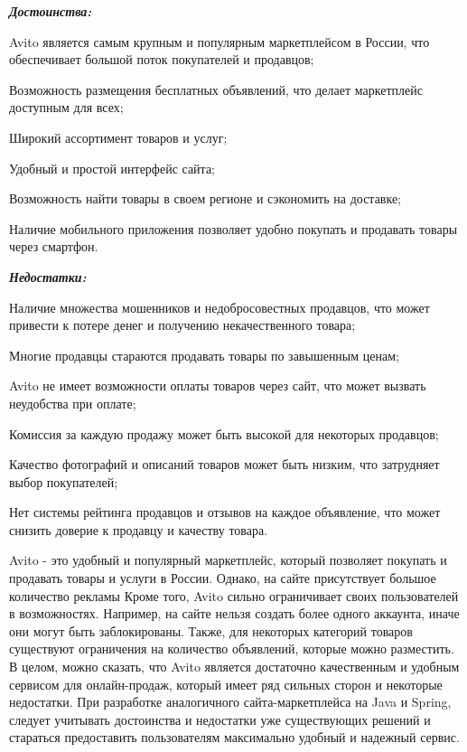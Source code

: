 \textbf{\emph{Достоинства:}}

\begin{compactitem}
    \item  Avito является самым крупным и популярным маркетплейсом в России, что обеспечивает большой поток покупателей и продавцов;
    \item  Возможность размещения бесплатных объявлений, что делает маркетплейс доступным для всех;
    \item  Широкий ассортимент товаров и услуг;
    \item  Удобный и простой интерфейс сайта;
    \item  Возможность найти товары в своем регионе и сэкономить на доставке;
    \item  Наличие мобильного приложения позволяет удобно покупать и продавать товары через смартфон.
\end{compactitem}

\textbf{\emph{Недостатки:}}

\begin{compactitem}
    \item  Наличие множества мошенников и недобросовестных продавцов, что может привести к потере денег и получению некачественного товара;
    \item  Многие продавцы стараются продавать товары по завышенным ценам;
    \item  Avito не имеет возможности оплаты товаров через сайт, что может вызвать неудобства при оплате;
    \item  Комиссия за каждую продажу может быть высокой для некоторых продавцов;
    \item  Качество фотографий и описаний товаров может быть низким, что затрудняет выбор покупателей;
    \item  Нет системы рейтинга продавцов и отзывов на каждое объявление, что может снизить доверие к продавцу и качеству товара.
\end{compactitem}


Avito - это удобный и популярный маркетплейс, который позволяет покупать и продавать товары и услуги в России. Однако, на сайте присутствует большое количество рекламы
Кроме того, Avito сильно ограничивает своих пользователей в возможностях. Например, на сайте нельзя создать более одного аккаунта, иначе они могут быть заблокированы. Также, для некоторых категорий товаров существуют ограничения на количество объявлений, которые можно разместить.
В целом, можно сказать, что Avito является достаточно качественным и удобным сервисом для онлайн-продаж, который имеет ряд сильных сторон и некоторые недостатки. При разработке аналогичного сайта-маркетплейса на Java и Spring, следует учитывать достоинства и недостатки уже существующих решений и стараться предоставить пользователям максимально удобный и надежный сервис.








